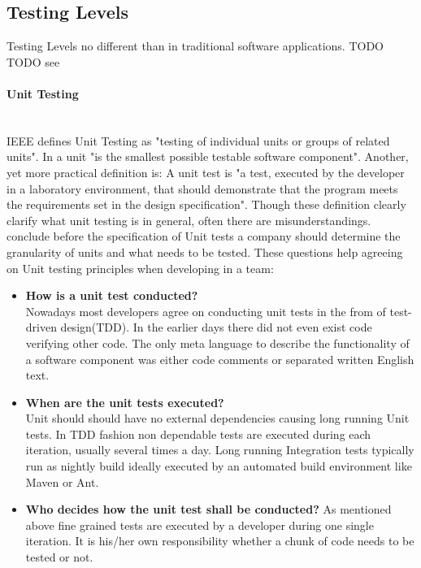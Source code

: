 \documentclass[12pt, notitlepage]{article}
\begin{document}
\subsection{Testing Levels}
Testing Levels no different than in traditional software applications. TODO
TODO see \cite{sw-testing-quality-assurance}
\paragraph{Unit Testing} ~\\
IEEE defines Unit Testing as\cite{ieee-definition} "testing of individual units or groups of related units". In \cite{sw-testing-quality-assurance}
a unit "is the smallest possible testable software component". Another, yet more practical definition is\cite{practical-unit-testing-definition}:
A unit test is "a test, executed by the developer in a laboratory environment, that should demonstrate that the program meets the requirements set in the design specification". Though these definition clearly clarify what unit testing is in general, often there are misunderstandings. \cite{unit-testing-survey} conclude
before the specification of Unit tests a company should determine the granularity of units and what needs to be tested.
These questions help agreeing on Unit testing principles when developing in a team:\\
\begin{itemize}
	\item \textbf{How is a unit test conducted?}\\
	Nowadays most developers agree on conducting unit tests in the from of test-driven design(TDD)\cite{beck-tdd}. 
	In the earlier days there did not even exist code verifying other code. The only meta language to describe the functionality of a software component was either
	code comments or separated written English text.
	\item \textbf{When are the unit tests executed?}\\
	Unit should should have no external dependencies causing long running Unit tests. In TDD fashion non dependable tests are executed during each iteration,
	usually several times a day. Long running Integration tests typically run as nightly build ideally executed by an automated build environment like
	Maven\cite{maven} or Ant\cite{ant}.
	\item \textbf{Who decides how the unit test shall be conducted?}
	As mentioned above fine grained tests are executed by a developer during one single iteration. It is his/her own responsibility whether a chunk of code needs to
	be tested or not.
\end{itemize}
\end{document}
